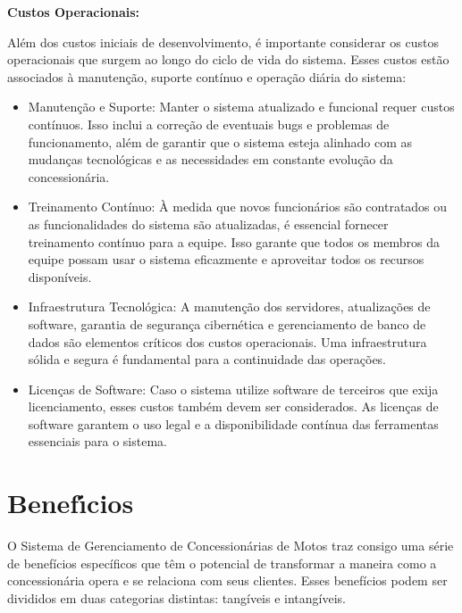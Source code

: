 \textbf{Custos Operacionais:}

Além dos custos iniciais de desenvolvimento, é importante considerar os custos operacionais que surgem ao longo do ciclo de vida do sistema. Esses custos estão associados à manutenção, suporte contínuo e operação diária do sistema:

\begin{itemize}
	\item Manutenção e Suporte: Manter o sistema atualizado e funcional requer custos contínuos. Isso inclui a correção de eventuais bugs e problemas de funcionamento, além de garantir que o sistema esteja alinhado com as mudanças tecnológicas e as necessidades em constante evolução da concessionária.
	
	\item Treinamento Contínuo: À medida que novos funcionários são contratados ou as funcionalidades do sistema são atualizadas, é essencial fornecer treinamento contínuo para a equipe. Isso garante que todos os membros da equipe possam usar o sistema eficazmente e aproveitar todos os recursos disponíveis.
	
	\item Infraestrutura Tecnológica: A manutenção dos servidores, atualizações de software, garantia de segurança cibernética e gerenciamento de banco de dados são elementos críticos dos custos operacionais. Uma infraestrutura sólida e segura é fundamental para a continuidade das operações. 
	
	\item Licenças de Software: Caso o sistema utilize software de terceiros que exija licenciamento, esses custos também devem ser considerados. As licenças de software garantem o uso legal e a disponibilidade contínua das ferramentas essenciais para o sistema.
\end{itemize}


\section{Benef\'{\i}cios}
O Sistema de Gerenciamento de Concessionárias de Motos traz consigo uma série de benefícios específicos que têm o potencial de transformar a maneira como a concessionária opera e se relaciona com seus clientes. Esses benefícios podem ser divididos em duas categorias distintas: tangíveis e intangíveis.

